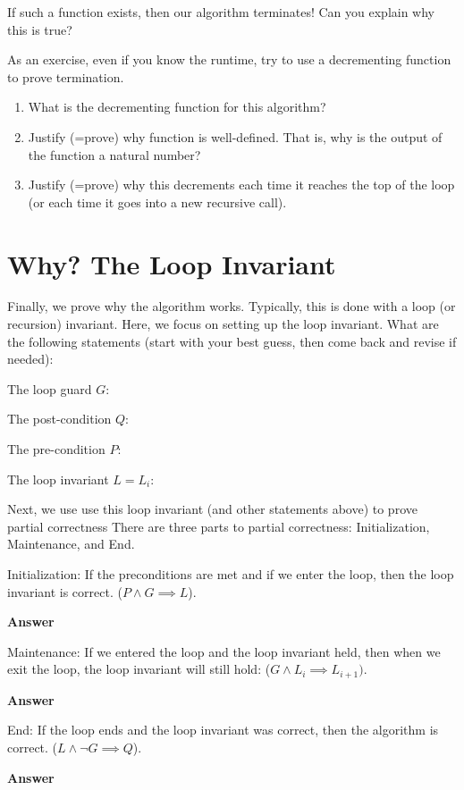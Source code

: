 \documentclass{article}
\begin{document}
If such a function exists, then our algorithm terminates!  Can you explain why
this is true?


As an exercise, even if you know the runtime, try to use a
decrementing function to prove termination.

\begin{enumerate}
    \item What is the decrementing function for this algorithm?
    \practice

    \item Justify (=prove) why function is well-defined.  That is, why is the
        output of the function a natural number?
    \practice

    \item     Justify (=prove) why this decrements each time it reaches the top
        of the loop (or each time it goes into a new recursive call).
    \practice

\end{enumerate}


\pagebreak
\section{Why? The Loop Invariant}

Finally, we prove why the algorithm works.  Typically, this is done with a loop
(or recursion) invariant.  Here, we focus on setting up the loop invariant.
What
are the following statements (start with your best guess, then come back and
revise if needed):

The loop guard $G$:
\vspace{0.5in}

The post-condition $Q$:
\vspace{0.5in}

The pre-condition $P$:
\vspace{0.5in}

The loop invariant $L=L_i$:
\vspace{0.5in}


\pagebreak
Next, we use use this loop invariant (and other statements above)
to prove partial correctness There are three parts to partial
correctness: Initialization, Maintenance, and End.

Initialization: If the preconditions are met and if we enter the loop, then the
loop invariant is correct. ($P \wedge G \implies L$).

\textbf{Answer}
\vspace{1in}


Maintenance: If we entered the loop and the loop invariant held, then when we
exit the loop, the loop invariant will still hold: ($G \wedge L_i \implies
L_{i+1})$.

\textbf{Answer}
\vspace{1in}


End: If the loop ends and the loop invariant was correct, then the algorithm is
correct. ($L \wedge \neg G \implies Q$).

\textbf{Answer}
\vspace{1in}
\end{document}
